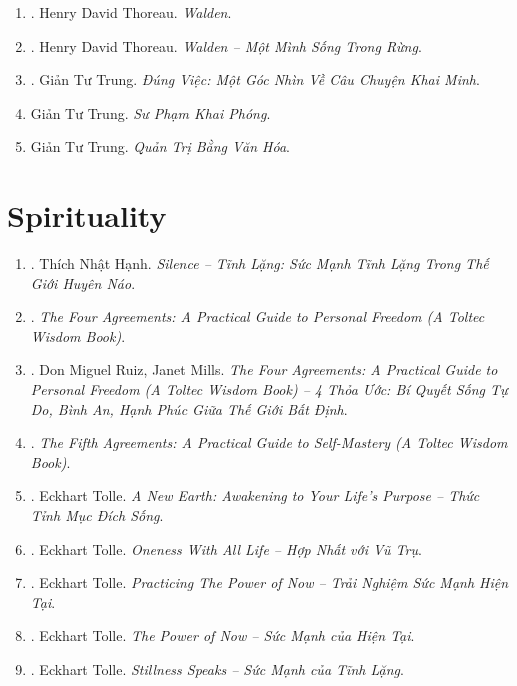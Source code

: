 \documentclass{article}
\begin{document}
\begin{enumerate}
	\item \cite{Thoreau2014}. Henry David Thoreau. \textit{Walden}.\hfill{\sf[reading]}
	\item \cite{Thoreau2023}. Henry David Thoreau. \textit{Walden -- Một Mình Sống Trong Rừng}.\hfill{\sf[done]}
	\item \cite{Trung_dung_viec}. Giản Tư Trung. \textit{Đúng Việc: Một Góc Nhìn Về Câu Chuyện Khai Minh}.\hfill{\sf[done]}
	\item Giản Tư Trung. \textit{Sư Phạm Khai Phóng}.
	\item Giản Tư Trung. \textit{Quản Trị Bằng Văn Hóa}.
\end{enumerate}


\section{Spirituality}

\begin{enumerate}
	\item \cite{Hanh_silence}. Thích Nhật Hạnh. \textit{Silence -- Tĩnh Lặng: Sức Mạnh Tĩnh Lặng Trong Thế Giới Huyên Náo}.\hfill{\sf[done]}
	\item \cite{Ruiz2011}. \textit{The Four Agreements: A Practical Guide to Personal Freedom (A Toltec Wisdom Book)}.\hfill{\sf[done]}
	\item \cite{Ruiz_Mills2022}. Don Miguel Ruiz, Janet Mills. \textit{The Four Agreements: A Practical Guide to Personal Freedom (A Toltec Wisdom Book) -- 4 Thỏa Ước: Bí Quyết Sống Tự Do, Bình An, Hạnh Phúc Giữa Thế Giới Bất Định}.\hfill{\sf[done]}
	\item \cite{Ruiz_Ruiz2011}. \textit{The Fifth Agreements: A Practical Guide to Self-Mastery (A Toltec Wisdom Book)}.\hfill{\sf[done]}
	\item \cite{Tolle2021d}. Eckhart Tolle. \textit{A New Earth: Awakening to Your Life's Purpose -- Thức Tỉnh Mục Đích Sống}.\hfill{\sf[done]}
	\item \cite{Tolle2021a}. Eckhart Tolle. \textit{Oneness With All Life -- Hợp Nhất với Vũ Trụ}.\hfill{\sf[done]}
	\item \cite{Tolle2021b}. Eckhart Tolle. \textit{Practicing The Power of Now -- Trải Nghiệm Sức Mạnh Hiện Tại}.\hfill{\sf[done]}
	\item \cite{Tolle2021c}. Eckhart Tolle. \textit{The Power of Now -- Sức Mạnh của Hiện Tại}.\hfill{\sf[done]}
	\item \cite{Tolle2022}. Eckhart Tolle. \textit{Stillness Speaks -- Sức Mạnh của Tĩnh Lặng}.\hfill{\sf[done]}
\end{enumerate}
\end{document}
